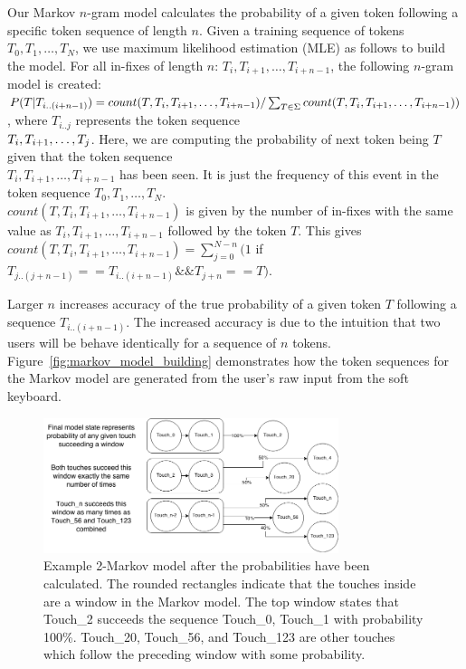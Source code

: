 \documentclass{acm_proc_article-sp}
\begin{document}
Our Markov $n$-gram model calculates the probability of a given token following a specific 
token sequence of length $n$. Given a training sequence of tokens $T_0, T_1, \dots , T_N$,
we use maximum likelihood estimation (MLE) as follows to build the model. For all in-fixes of
length $n$: $T_i, T_{i+1}, \dots , T_{i+n-1}$, the following $n$-gram model is created:
$P(T | T_{i..(i+n-1)}) =  count(T, T_i, T_{i+1}, \dots , T_{i+n-1})/\sum_{T \in \Sigma} count(
T, T_i, T_{i+1}, \dots , \\T_{i+n-1}))$, where $T_{i..j}$ represents the
token sequence \\
$T_i, T_{i+\\1}, \dots, T_j$. Here, we are computing the probability of next token being $T$
given that the token sequence \\
$T_i, T_{i+1}, \dots , T_{i+n-1}$ has been seen. It is just the
frequency of this event in the token sequence $T_0, T_1, \dots , T_N$. \\
$count(T, T_i, T_{i+1}, \dots , T_{i+n-1})$ is given by the number of in-fixes with the same value as
$T_i, T_{i+1}, \dots , T_{i+n-1}$ followed by the token $T$. This gives 
$count(T, T_i, T_{i+1}, \dots , T_{i+n-1}) = \sum_{j=0}^{N-n}(1$ if $T_{j..(j+n-1)} == T_{i..(i+n-1)} \&\&
T_{j+n} == T)$.

Larger $n$ increases accuracy of the true probability of a given token $T$ following
a sequence $T_{i..(i+n-1)}$. The increased accuracy is due to the intuition that 
two users will be behave identically for  a sequence of $n$ tokens.
Figure~\ref{fig:markov_model_building} demonstrates how the token sequences for the Markov model are generated from the user's raw input from the soft keyboard.

\begin{figure}
\centering
\includegraphics[width=3.4in]{figures/final_markov_model_state.png}
\caption{Example 2-Markov model after the probabilities have been calculated.
The rounded rectangles indicate that the touches inside are a window in the Markov model.
The top window states that Touch\_2 succeeds the sequence Touch\_0, Touch\_1 with probability 100\%.
Touch\_20, Touch\_56, and Touch\_123 are other touches which follow the preceding window with some probability.}
\label{fig:final_markov_model_state}
\end{figure}
\end{document}
